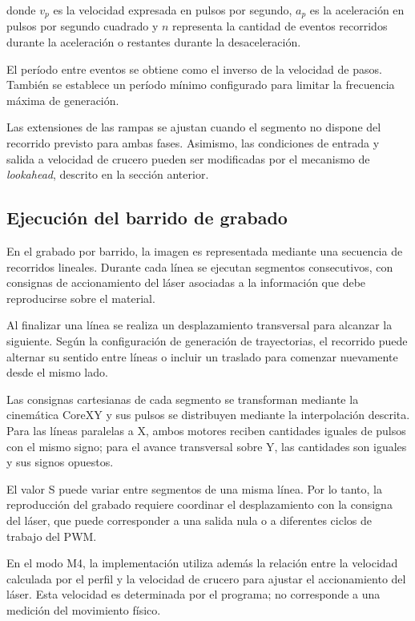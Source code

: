 \documentclass[blue,fullpaper]{ludusofficial}  %
\begin{document}
donde $v_p$ es la velocidad expresada en pulsos
por segundo, $a_p$ es la aceleración en pulsos
por segundo cuadrado y $n$ representa la cantidad
de eventos recorridos durante la aceleración
o restantes durante la desaceleración.

El período entre eventos se obtiene como
el inverso de la velocidad de pasos. También
se establece un período mínimo configurado
para limitar la frecuencia máxima de generación.

Las extensiones de las rampas se ajustan cuando
el segmento no dispone del recorrido previsto
para ambas fases. Asimismo, las condiciones
de entrada y salida a velocidad de crucero
pueden ser modificadas por el mecanismo
de \textit{lookahead}, descrito en la sección
anterior.

\subsection{Ejecución del barrido de grabado}

En el grabado por barrido, la imagen es representada
mediante una secuencia de recorridos lineales.
Durante cada línea se ejecutan segmentos consecutivos,
con consignas de accionamiento del láser asociadas
a la información que debe reproducirse sobre
el material.

Al finalizar una línea se realiza un desplazamiento
transversal para alcanzar la siguiente.
Según la configuración de generación de trayectorias,
el recorrido puede alternar su sentido entre líneas
o incluir un traslado para comenzar nuevamente
desde el mismo lado.

Las consignas cartesianas de cada segmento se
transforman mediante la cinemática CoreXY y sus
pulsos se distribuyen mediante la interpolación
descrita. Para las líneas paralelas a X,
ambos motores reciben cantidades iguales de pulsos
con el mismo signo; para el avance transversal
sobre Y, las cantidades son iguales y sus
signos opuestos.

El valor S puede variar entre segmentos de una
misma línea. Por lo tanto, la reproducción del
grabado requiere coordinar el desplazamiento
con la consigna del láser, que puede corresponder
a una salida nula o a diferentes ciclos de trabajo
del PWM.

En el modo M4, la implementación utiliza además
la relación entre la velocidad calculada por
el perfil y la velocidad de crucero para ajustar
el accionamiento del láser. Esta velocidad
es determinada por el programa; no corresponde
a una medición del movimiento físico.
\end{document}

